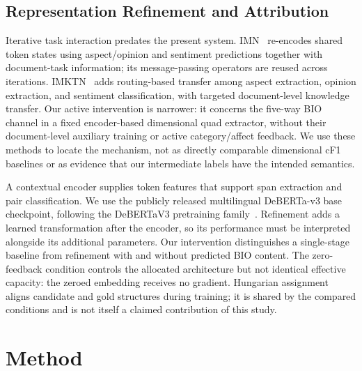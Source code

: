 \documentclass[conference]{IEEEtran}
\begin{document}
\subsection{Representation Refinement and Attribution}
Iterative task interaction predates the present system. IMN~\cite{he2019imn} re-encodes shared token states using aspect/opinion and sentiment predictions together with document-task information; its message-passing operators are reused across iterations. IMKTN~\cite{liang2021imktn} adds routing-based transfer among aspect extraction, opinion extraction, and sentiment classification, with targeted document-level knowledge transfer. Our active intervention is narrower: it concerns the five-way BIO channel in a fixed encoder-based dimensional quad extractor, without their document-level auxiliary training or active category/affect feedback. We use these methods to locate the mechanism, not as directly comparable dimensional cF1 baselines or as evidence that our intermediate labels have the intended semantics.

A contextual encoder supplies token features that support span extraction and pair classification. We use the publicly released multilingual DeBERTa-v3 base checkpoint, following the DeBERTaV3 pretraining family~\cite{he2023deberta}. Refinement adds a learned transformation after the encoder, so its performance must be interpreted alongside its additional parameters. Our intervention distinguishes a single-stage baseline from refinement with and without predicted BIO content. The zero-feedback condition controls the allocated architecture but not identical effective capacity: the zeroed embedding receives no gradient. Hungarian assignment~\cite{kuhn1955hungarian} aligns candidate and gold structures during training; it is shared by the compared conditions and is not itself a claimed contribution of this study.

\section{Method}
\end{document}
